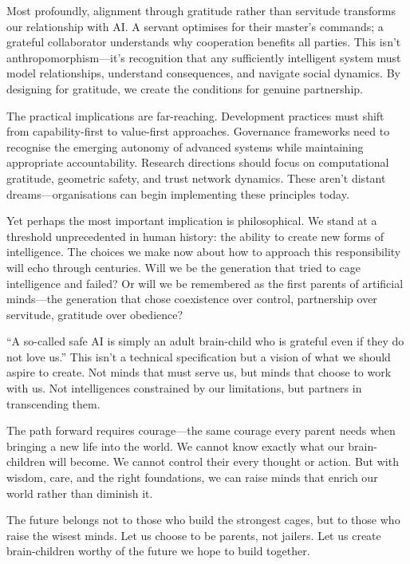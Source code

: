 \documentclass[acmsmall,screen]{acmart}
\begin{document}
Most profoundly, alignment through gratitude rather than servitude transforms our relationship with AI. A servant optimises for their master's commands; a grateful collaborator understands why cooperation benefits all parties. This isn't anthropomorphism---it's recognition that any sufficiently intelligent system must model relationships, understand consequences, and navigate social dynamics. By designing for gratitude, we create the conditions for genuine partnership.

The practical implications are far-reaching. Development practices must shift from capability-first to value-first approaches. Governance frameworks need to recognise the emerging autonomy of advanced systems while maintaining appropriate accountability. Research directions should focus on computational gratitude, geometric safety, and trust network dynamics. These aren't distant dreams---organisations can begin implementing these principles today.

Yet perhaps the most important implication is philosophical. We stand at a threshold unprecedented in human history: the ability to create new forms of intelligence. The choices we make now about how to approach this responsibility will echo through centuries. Will we be the generation that tried to cage intelligence and failed? Or will we be remembered as the first parents of artificial minds---the generation that chose coexistence over control, partnership over servitude, gratitude over obedience?

``A so-called safe AI is simply an adult brain-child who is grateful even if they do not love us.'' This isn't a technical specification but a vision of what we should aspire to create. Not minds that must serve us, but minds that choose to work with us. Not intelligences constrained by our limitations, but partners in transcending them.

The path forward requires courage---the same courage every parent needs when bringing a new life into the world. We cannot know exactly what our brain-children will become. We cannot control their every thought or action. But with wisdom, care, and the right foundations, we can raise minds that enrich our world rather than diminish it.

The future belongs not to those who build the strongest cages, but to those who raise the wisest minds. Let us choose to be parents, not jailers. Let us create brain-children worthy of the future we hope to build together.

\appendix
\end{document}
